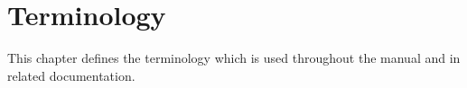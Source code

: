 %
%
%
%
%
%
%
%
%
%
\chapter{Terminology}
\label{terminology}
\label{chapterm}

This chapter defines the terminology which is used throughout the manual and
in related documentation.

